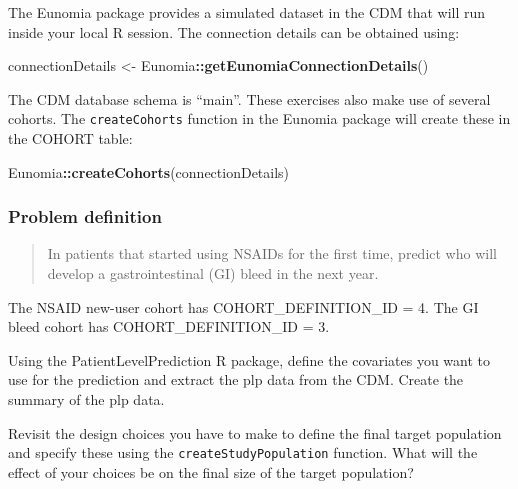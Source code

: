 \documentclass[11pt]{book}
\newenvironment{Shaded}{\begin{snugshade}}{\end{snugshade}}
\newcommand{\KeywordTok}[1]{\textcolor[rgb]{0.13,0.29,0.53}{\textbf{#1}}}
\newcommand{\NormalTok}[1]{#1}
\newcommand{\OperatorTok}[1]{\textcolor[rgb]{0.81,0.36,0.00}{\textbf{#1}}}
\newcommand{\StringTok}[1]{\textcolor[rgb]{0.31,0.60,0.02}{#1}}
\theoremstyle{definition}
\theoremstyle{definition}
\theoremstyle{definition}
\theoremstyle{remark}
\let\BeginKnitrBlock\begin \let\EndKnitrBlock\end
\begin{document}
The Eunomia package provides a simulated dataset in the CDM that will run inside your local R session. The connection details can be obtained using:

\begin{Shaded}
\begin{Highlighting}[]
\NormalTok{connectionDetails <-}\StringTok{ }\NormalTok{Eunomia}\OperatorTok{::}\KeywordTok{getEunomiaConnectionDetails}\NormalTok{()}
\end{Highlighting}
\end{Shaded}

The CDM database schema is ``main''. These exercises also make use of several cohorts. The \texttt{createCohorts} function in the Eunomia package will create these in the COHORT table:

\begin{Shaded}
\begin{Highlighting}[]
\NormalTok{Eunomia}\OperatorTok{::}\KeywordTok{createCohorts}\NormalTok{(connectionDetails)}
\end{Highlighting}
\end{Shaded}

\hypertarget{problem-definition-3}{%
\subsubsection*{Problem definition}\label{problem-definition-3}}

\begin{quote}
In patients that started using NSAIDs for the first time, predict who will develop a gastrointestinal (GI) bleed in the next year.
\end{quote}

The NSAID new-user cohort has COHORT\_DEFINITION\_ID = 4. The GI bleed cohort has COHORT\_DEFINITION\_ID = 3.

\BeginKnitrBlock{exercise}
\protect\hypertarget{exr:exercisePlp1}{}{\label{exr:exercisePlp1} }Using the PatientLevelPrediction R package, define the covariates you want to use for the prediction and extract the plp data from the CDM. Create the summary of the plp data.
\EndKnitrBlock{exercise}

\BeginKnitrBlock{exercise}
\protect\hypertarget{exr:exercisePlp2}{}{\label{exr:exercisePlp2} }Revisit the design choices you have to make to define the final target population and specify these using the \texttt{createStudyPopulation} function. What will the effect of your choices be on the final size of the target population?
\EndKnitrBlock{exercise}
\end{document}
